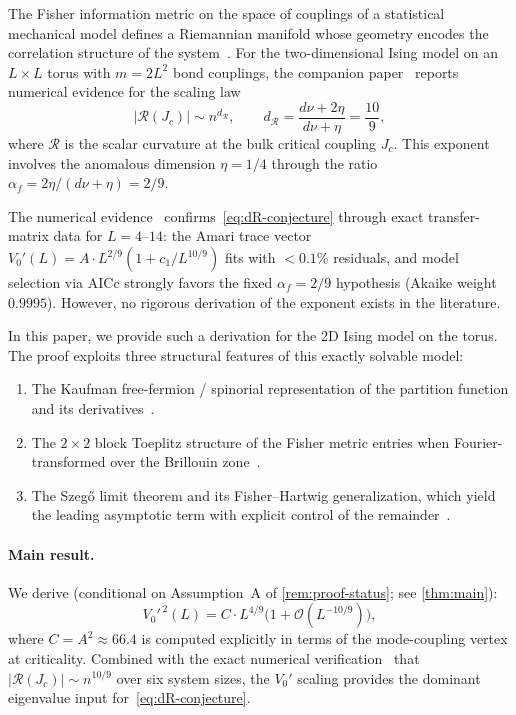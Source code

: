 \documentclass[11pt]{article}
\theoremstyle{definition}
\theoremstyle{remark}
\newcommand{\Jc}{J_c}
\newcommand{\dR}{d_{\mathcal{R}}}
\newcommand{\Scal}{\mathcal{R}}
\newcommand{\cO}{\mathcal{O}}
\begin{document}
The Fisher information metric on the space of couplings of a
statistical mechanical model defines a Riemannian manifold whose
geometry encodes the correlation structure of the
system~\cite{Paper7,Ruppeiner1979}.
For the two-dimensional Ising model on an $L \times L$ torus with
$m = 2L^2$ bond couplings, the companion paper~\cite{PredLetter}
reports numerical evidence for the scaling law
\begin{equation}
  |\Scal(\Jc)| \sim n^{\dR}, \qquad
  \dR = \frac{d\nu + 2\eta}{d\nu + \eta} = \frac{10}{9},
  \label{eq:dR-conjecture}
\end{equation}
where $\Scal$ is the scalar curvature at the bulk critical coupling
$\Jc$. This exponent involves the anomalous dimension $\eta = 1/4$
through the ratio $\alpha_f = 2\eta/(d\nu + \eta) = 2/9$.

The numerical evidence~\cite{PredLetter} confirms~\eqref{eq:dR-conjecture}
through exact transfer-matrix data for $L = 4$--$14$: the Amari trace
vector $V_0'(L) = A \cdot L^{2/9}(1 + c_1/L^{10/9})$ fits with
$< 0.1\%$ residuals, and model selection via AICc strongly favors
the fixed $\alpha_f = 2/9$ hypothesis (Akaike weight $0.9995$).
However, no rigorous derivation of the exponent exists in the literature.

In this paper, we provide such a derivation for the 2D Ising model
on the torus. The proof exploits three structural features of this
exactly solvable model:
\begin{enumerate}
  \item The Kaufman free-fermion / spinorial representation of the
    partition function and its derivatives~\cite{Kaufman1949,McCoyWu1973}.
  \item The $2 \times 2$ block Toeplitz structure of the Fisher metric
    entries when Fourier-transformed over the Brillouin
    zone~\cite{BottcherSilbermann1999}.
  \item The Szeg\H{o} limit theorem and its Fisher--Hartwig
    generalization, which yield the leading asymptotic term with
    explicit control of the remainder~\cite{Szego1952,FisherHartwig1968,
    BasorWidom1983}.
\end{enumerate}

\paragraph{Main result.}
We derive (conditional on Assumption~A of \cref{rem:proof-status}; see \cref{thm:main}):
\[
  V_0'^{\,2}(L) = C \cdot L^{4/9}\bigl(1 + \cO(L^{-10/9})\bigr),
\]
where $C = A^2 \approx 66.4$ is computed explicitly in terms of the
mode-coupling vertex at criticality. Combined with the exact numerical
verification~\cite{PredLetter} that $|\Scal(\Jc)| \sim n^{10/9}$
over six system sizes, the $V_0'$ scaling provides the dominant
eigenvalue input for~\eqref{eq:dR-conjecture}.
\end{document}
